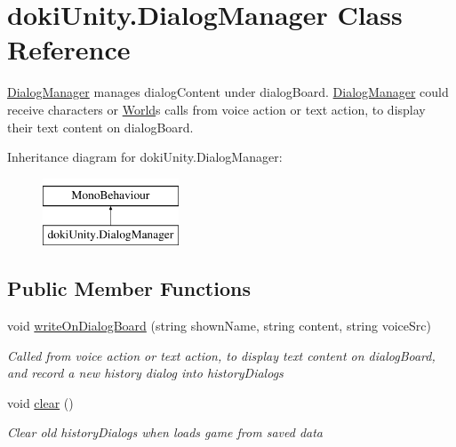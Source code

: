 \hypertarget{classdoki_unity_1_1_dialog_manager}{}\section{doki\+Unity.\+Dialog\+Manager Class Reference}
\label{classdoki_unity_1_1_dialog_manager}


\hyperlink{classdoki_unity_1_1_dialog_manager}{Dialog\+Manager} manages dialog\+Content under dialog\+Board. \hyperlink{classdoki_unity_1_1_dialog_manager}{Dialog\+Manager} could receive characters\textquotesingle{} or \hyperlink{classdoki_unity_1_1_world}{World}\textquotesingle{}s calls from voice action or text action, to display their text content on dialog\+Board.  


Inheritance diagram for doki\+Unity.\+Dialog\+Manager\+:\begin{figure}[H]
\begin{center}
\leavevmode
\includegraphics[height=2.000000cm]{classdoki_unity_1_1_dialog_manager}
\end{center}
\end{figure}
\subsection*{Public Member Functions}
\begin{DoxyCompactItemize}
\item 
void \hyperlink{classdoki_unity_1_1_dialog_manager_aaa83f44df93ea43dfcb43b397c419335}{write\+On\+Dialog\+Board} (string shown\+Name, string content, string voice\+Src)
\begin{DoxyCompactList}\small\item\em Called from voice action or text action, to display text content on dialog\+Board, and record a new history dialog into history\+Dialogs \end{DoxyCompactList}\item 
void \hyperlink{classdoki_unity_1_1_dialog_manager_a158466e21dd6040ad2da70ad9b7ec76e}{clear} ()
\begin{DoxyCompactList}\small\item\em Clear old history\+Dialogs when loads game from saved data \end{DoxyCompactList}\end{DoxyCompactItemize}
